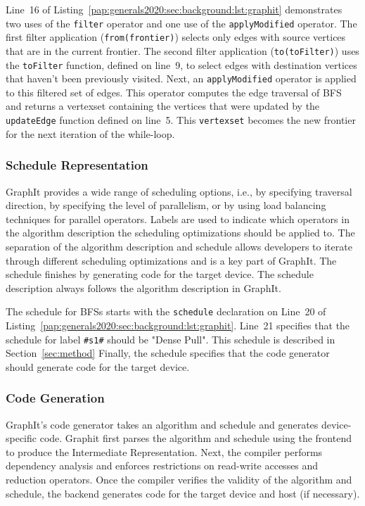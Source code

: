 Line~16 of Listing~\ref{pap:generals2020:sec:background:lst:graphit} demonstrates two uses of the \lstinline[language=graphit]{filter} operator and one use of the \lstinline[language=graphit]{applyModified} operator. 
The first filter application (\lstinline[language=graphit]{from(frontier)}) selects only edges with source vertices that are in the current frontier. 
The second filter application (\lstinline[language=graphit]{to(toFilter)}) uses the \lstinline[language=graphit]{toFilter} function, defined on line~9, to select edges with destination vertices that haven't been previously visited.
Next, an \lstinline[language=graphit]{applyModified} operator is applied to this filtered set of edges.
This operator computes the edge traversal of BFS and returns a vertexset containing the vertices that were updated by the \lstinline[language=graphit]{updateEdge} function defined on line~5.
This \lstinline[language=graphit]{vertexset} becomes the new frontier for the next iteration of the while-loop.

\subsubsection{Schedule Representation}
GraphIt provides a wide range of scheduling options, i.e., by specifying traversal direction, by specifying the level of parallelism, or by using load balancing techniques for parallel operators.
Labels are used to indicate which operators in the algorithm description the scheduling optimizations should be applied to.
The separation of the algorithm description and schedule allows developers to iterate through different scheduling optimizations and is a key part of GraphIt.
The schedule finishes by generating code for the target device.
The schedule description always follows the algorithm description in GraphIt.

The schedule for BFSs starts with the \lstinline[language=graphit]{schedule} declaration on Line~20 of Listing~\ref{pap:generals2020:sec:background:lst:graphit}. Line~21 specifies that the schedule for label \lstinline[language=graphit]{#s1#} should be "Dense Pull". This schedule is described in Section~\ref{sec:method}
Finally, the schedule specifies that the code generator should generate code for the target device. 

\subsubsection{Code Generation}
GraphIt's code generator takes an algorithm and schedule and generates device-specific code.
Graphit first parses the algorithm and schedule using the frontend to produce the Intermediate Representation. 
Next, the compiler performs dependency analysis and enforces restrictions on read-write accesses and reduction operators. 
Once the compiler verifies the validity of the algorithm and schedule, the backend generates code for the target device and host (if necessary).
